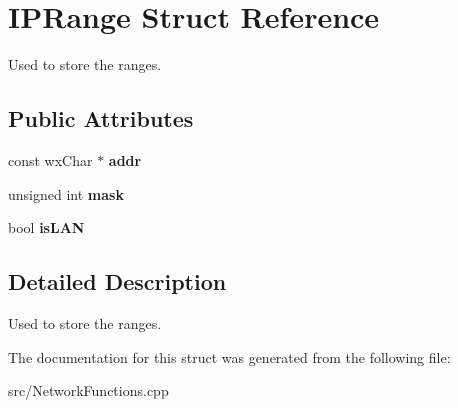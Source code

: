 \section{IPRange Struct Reference}
\label{structIPRange}


Used to store the ranges.  
\subsection*{Public Attributes}
\begin{DoxyCompactItemize}
\item 
const wxChar $\ast$ {\bfseries addr}\label{structIPRange_a662978c32d219f72de794b07cbab4db0}

\item 
unsigned int {\bfseries mask}\label{structIPRange_a7c03586f954f2c5c2bf606e8641620c1}

\item 
bool {\bfseries isLAN}\label{structIPRange_ac92a70af4e40f1de28ce2b412e1a23a0}

\end{DoxyCompactItemize}


\subsection{Detailed Description}
Used to store the ranges. 

The documentation for this struct was generated from the following file:\begin{DoxyCompactItemize}
\item 
src/NetworkFunctions.cpp\end{DoxyCompactItemize}
